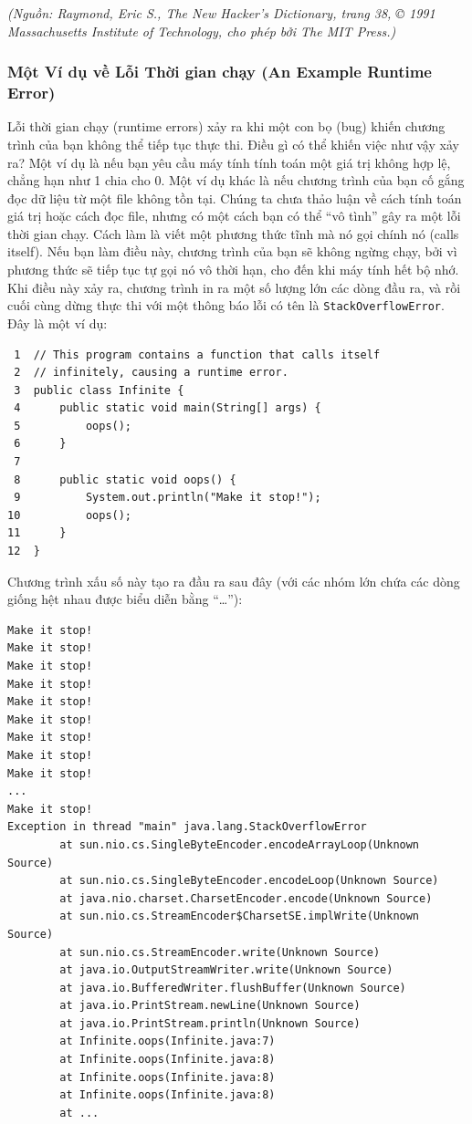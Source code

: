 \emph{(Nguồn: Raymond, Eric S., The New Hacker's Dictionary, trang 38, ©
1991 Massachusetts Institute of Technology, cho phép bởi The MIT
Press.)}

\subsubsection{Một Ví dụ về Lỗi Thời gian chạy (An Example Runtime
Error)}\label{mux1ed9t-vuxed-dux1ee5-vux1ec1-lux1ed7i-thux1eddi-gian-chux1ea1y-an-example-runtime-error}

Lỗi thời gian chạy (runtime errors) xảy ra khi một con bọ (bug) khiến
chương trình của bạn không thể tiếp tục thực thi. Điều gì có thể khiến
việc như vậy xảy ra? Một ví dụ là nếu bạn yêu cầu máy tính tính toán một
giá trị không hợp lệ, chẳng hạn như 1 chia cho 0. Một ví dụ khác là nếu
chương trình của bạn cố gắng đọc dữ liệu từ một file không tồn tại.
Chúng ta chưa thảo luận về cách tính toán giá trị hoặc cách đọc file,
nhưng có một cách bạn có thể ``vô tình'' gây ra một lỗi thời gian chạy.
Cách làm là viết một phương thức tĩnh mà nó gọi chính nó (calls itself).
Nếu bạn làm điều này, chương trình của bạn sẽ không ngừng chạy, bởi vì
phương thức sẽ tiếp tục tự gọi nó vô thời hạn, cho đến khi máy tính hết
bộ nhớ. Khi điều này xảy ra, chương trình in ra một số lượng lớn các
dòng đầu ra, và rồi cuối cùng dừng thực thi với một thông báo lỗi có tên
là \texttt{StackOverflowError}. Đây là một ví dụ:

\begin{verbatim}
 1  // This program contains a function that calls itself
 2  // infinitely, causing a runtime error.
 3  public class Infinite {
 4      public static void main(String[] args) {
 5          oops();
 6      }
 7
 8      public static void oops() {
 9          System.out.println("Make it stop!");
10          oops();
11      }
12  }
\end{verbatim}

Chương trình xấu số này tạo ra đầu ra sau đây (với các nhóm lớn chứa các
dòng giống hệt nhau được biểu diễn bằng ``\ldots{}''):

\begin{verbatim}
Make it stop! 
Make it stop! 
Make it stop! 
Make it stop! 
Make it stop! 
Make it stop! 
Make it stop! 
Make it stop! 
Make it stop! 
... 
Make it stop! 
Exception in thread "main" java.lang.StackOverflowError 
        at sun.nio.cs.SingleByteEncoder.encodeArrayLoop(Unknown Source) 
        at sun.nio.cs.SingleByteEncoder.encodeLoop(Unknown Source) 
        at java.nio.charset.CharsetEncoder.encode(Unknown Source) 
        at sun.nio.cs.StreamEncoder$CharsetSE.implWrite(Unknown Source) 
        at sun.nio.cs.StreamEncoder.write(Unknown Source) 
        at java.io.OutputStreamWriter.write(Unknown Source) 
        at java.io.BufferedWriter.flushBuffer(Unknown Source) 
        at java.io.PrintStream.newLine(Unknown Source) 
        at java.io.PrintStream.println(Unknown Source) 
        at Infinite.oops(Infinite.java:7) 
        at Infinite.oops(Infinite.java:8) 
        at Infinite.oops(Infinite.java:8) 
        at Infinite.oops(Infinite.java:8) 
        at ...
\end{verbatim}

